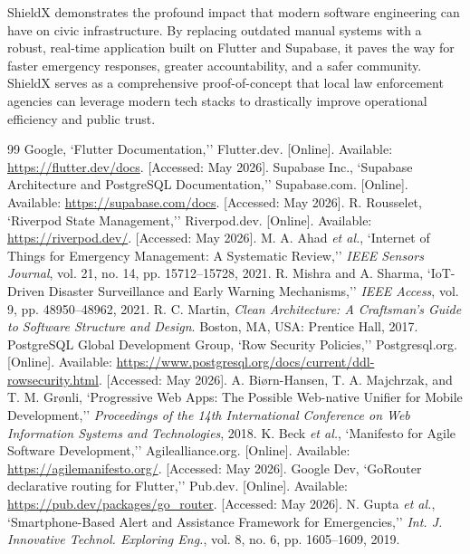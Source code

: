 \documentclass[12pt, a4paper, twoside, openany]{report}
\renewcommand{\bibname}{References}
\begin{document}
\vspace{0.5cm}
ShieldX demonstrates the profound impact that modern software engineering can have on civic infrastructure. By replacing outdated manual systems with a robust, real-time application built on Flutter and Supabase, it paves the way for faster emergency responses, greater accountability, and a safer community. ShieldX serves as a comprehensive proof-of-concept that local law enforcement agencies can leverage modern tech stacks to drastically improve operational efficiency and public trust.
\renewcommand{\bibname}{References}
\begin{thebibliography}{99}
 Google, `Flutter Documentation,'' Flutter.dev. [Online]. Available: \url{https://flutter.dev/docs}. [Accessed: May 2026].
 Supabase Inc., `Supabase Architecture and PostgreSQL Documentation,'' Supabase.com. [Online]. Available: \url{https://supabase.com/docs}. [Accessed: May 2026].
 R. Rousselet, `Riverpod State Management,'' Riverpod.dev. [Online]. Available: \url{https://riverpod.dev/}. [Accessed: May 2026].
 M. A. Ahad \textit{et al.}, `Internet of Things for Emergency Management: A Systematic Review,'' \textit{IEEE Sensors Journal}, vol. 21, no. 14, pp. 15712--15728, 2021.
 R. Mishra and A. Sharma, `IoT-Driven Disaster Surveillance and Early Warning Mechanisms,'' \textit{IEEE Access}, vol. 9, pp. 48950--48962, 2021.
 R. C. Martin, \textit{Clean Architecture: A Craftsman's Guide to Software Structure and Design}. Boston, MA, USA: Prentice Hall, 2017.
 PostgreSQL Global Development Group, `Row Security Policies,'' Postgresql.org. [Online]. Available: \url{https://www.postgresql.org/docs/current/ddl-rowsecurity.html}. [Accessed: May 2026].
 A. Biørn-Hansen, T. A. Majchrzak, and T. M. Grønli, `Progressive Web Apps: The Possible Web-native Unifier for Mobile Development,'' \textit{Proceedings of the 14th International Conference on Web Information Systems and Technologies}, 2018.
 K. Beck \textit{et al.}, `Manifesto for Agile Software Development,'' Agilealliance.org. [Online]. Available: \url{https://agilemanifesto.org/}. [Accessed: May 2026].
 Google Dev, `GoRouter declarative routing for Flutter,'' Pub.dev. [Online]. Available: \url{https://pub.dev/packages/go_router}. [Accessed: May 2026].
 N. Gupta \textit{et al.}, `Smartphone-Based Alert and Assistance Framework for Emergencies,'' \textit{Int. J. Innovative Technol. Exploring Eng.}, vol. 8, no. 6, pp. 1605--1609, 2019.

\end{thebibliography}
\end{document}
